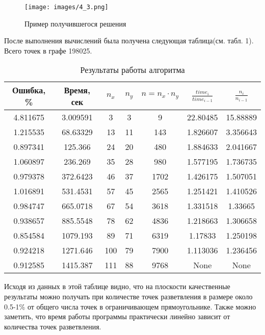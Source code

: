 \begin{figure}[H]
	\texttt{[image: images/4\_3.png]}
	\caption{Пример получившегося решения}
\end{figure}
\vskip 4mm


После выполнения вычислений была получена следующая таблица(см. табл. 1). Всего точек в графе 198025.

\begin{table}[H]
	\centering
	\caption{Результаты работы алгоритма}
	\begin{tabular}{|c|c|c|c|c|c|c|}
		\hline
		\textbf{Ошибка, \%} & \textbf{Время, сек} &	\textbf{$n_x$} &	\textbf{$n_y$} & \textbf{$n = n_x  \cdot n_y$} & \textbf{$\frac{time_{i}}{time_{i-1}}$} &	\textbf{$\frac{n_i}{n_{i-1}}$}   \\ \hline
		4.811675 &	3.009591 &	3 &	3 &	9 &	22.80485 &	15.88889 \\ \hline
		1.215535 &	68.63329 &	13 & 11 &	143 &	1.826607 &	3.356643 \\ \hline
		0.897341 &	125.366 &	24 & 20 &	480 &	1.884633 &	2.041667 \\ \hline
		1.060897 &	236.269 &	35 & 28 &	980 &	1.577195 &	1.736735 \\ \hline
		0.979378 &	372.6423 &	46 & 37 &	1702 &	1.426175 &	1.507051 \\ \hline
		1.016891 &	531.4531 &	57 & 45 &	2565 &	1.251421 &	1.410526 \\ \hline
		0.984747 &	665.0718 &	67 & 54 &	3618 &	1.331518 &	1.33665 \\ \hline
		0.938657 &	885.5548 &	78 & 62 &	4836 &	1.218663 &	1.306658 \\ \hline
		0.854584 &	1079.193 &	89 & 71 &	6319 &	1.17833 &	1.250198 \\ \hline
		0.924218 &	1271.646 &	100 & 79 &	7900 &	1.113036 &	1.236456 \\ \hline
		0.912585 &	1415.387 &	111	& 88 &	9768 &	None &	None \\ \hline
	\end{tabular}
\end{table}
\vspace{4mm}

Исходя из данных в этой таблице видно, что на плоскости качественные результаты можно получать при количестве точек разветвления в размере около 0.5-1\% от общего числа точек в ограничивающем прямоугольнике. Также можно заметить, что время работы программы практически линейно зависит от количества точек разветвления.










